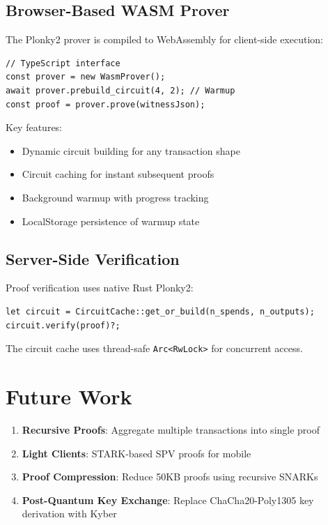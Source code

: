 \documentclass[11pt,a4paper]{article}
\begin{document}
\subsection{Browser-Based WASM Prover}

The Plonky2 prover is compiled to WebAssembly for client-side execution:

\begin{lstlisting}
// TypeScript interface
const prover = new WasmProver();
await prover.prebuild_circuit(4, 2); // Warmup
const proof = prover.prove(witnessJson);
\end{lstlisting}

Key features:
\begin{itemize}
    \item Dynamic circuit building for any transaction shape
    \item Circuit caching for instant subsequent proofs
    \item Background warmup with progress tracking
    \item LocalStorage persistence of warmup state
\end{itemize}

\subsection{Server-Side Verification}

Proof verification uses native Rust Plonky2:

\begin{lstlisting}
let circuit = CircuitCache::get_or_build(n_spends, n_outputs);
circuit.verify(proof)?;
\end{lstlisting}

The circuit cache uses thread-safe \texttt{Arc<RwLock>} for concurrent access.

\section{Future Work}

\begin{enumerate}
    \item \textbf{Recursive Proofs}: Aggregate multiple transactions into single proof
    \item \textbf{Light Clients}: STARK-based SPV proofs for mobile
    \item \textbf{Proof Compression}: Reduce 50KB proofs using recursive SNARKs
    \item \textbf{Post-Quantum Key Exchange}: Replace ChaCha20-Poly1305 key derivation with Kyber
\end{enumerate}
\end{document}
